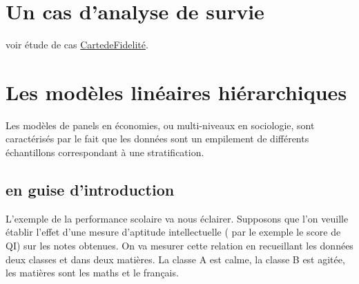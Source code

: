 \documentclass[
]{book}
\begin{document}
\hypertarget{un-cas-danalyse-de-survie}{%
\chapter{Un cas d'analyse de survie}\label{un-cas-danalyse-de-survie}}

voir étude de cas \href{https://github.com/BenaventC/survival}{CartedeFidelité}.

\hypertarget{les-moduxe8les-linuxe9aires-hiuxe9rarchiques}{%
\chapter{Les modèles linéaires hiérarchiques}\label{les-moduxe8les-linuxe9aires-hiuxe9rarchiques}}

Les modèles de panels en économies, ou multi-niveaux en sociologie, sont caractérisés par le fait que les données sont un empilement de différents échantillons correspondant à une stratification.

\hypertarget{en-guise-dintroduction}{%
\section{en guise d'introduction}\label{en-guise-dintroduction}}

L'exemple de la performance scolaire va nous éclairer. Supposons que l'on veuille établir l'effet d'une mesure d'aptitude intellectuelle ( par le exemple le score de QI) sur les notes obtenues. On va mesurer cette relation en recueillant les données deux classes et dans deux matières. La classe A est calme, la classe B est agitée, les matières sont les maths et le français.
\end{document}
